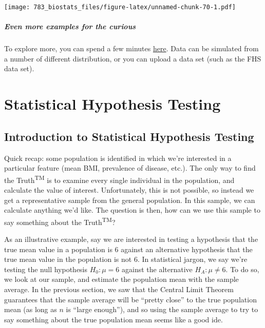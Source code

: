 \documentclass[]{book}
\theoremstyle{definition}
\theoremstyle{definition}
\theoremstyle{definition}
\theoremstyle{remark}
\begin{document}
\texttt{[image: 783\_biostats\_files/figure-latex/unnamed-chunk-70-1.pdf]}

\hypertarget{even-more-examples-for-the-curious}{%
\subsubsection*{Even more examples for the curious}\label{even-more-examples-for-the-curious}}

To explore more, you can spend a few minutes \href{https://rtrane.shinyapps.io/CLT_2/}{here}. Data can be simulated from a number of different distribution, or you can upload a data set (such as the FHS data set).

\hypertarget{part-statistical-hypothesis-testing}{%
\part{Statistical Hypothesis Testing}\label{part-statistical-hypothesis-testing}}

\hypertarget{introduction-to-statistical-hypothesis-testing}{%
\chapter{Introduction to Statistical Hypothesis Testing}\label{introduction-to-statistical-hypothesis-testing}}

Quick recap: some population is identified in which we're interested in a particular feature (mean BMI, prevalence of disease, etc.). The only way to find the Truth\textsuperscript{TM} is to examine every single individual in the population, and calculate the value of interest. Unfortunately, this is not possible, so instead we get a representative sample from the general population. In this sample, we can calculate anything we'd like. The question is then, how can we use this sample to say something about the Truth\textsuperscript{TM}?

As an illustrative example, say we are interested in testing a hypothesis that the true mean value in a population is 6 against an alternative hypothesis that the true mean value in the population is not 6. In statistical jargon, we say we're testing the null hypothesis \(H_0: \mu = 6\) against the alternative \(H_A: \mu \neq 6\). To do so, we look at our sample, and estimate the population mean with the sample average. In the previous section, we saw that the Central Limit Theorem guarantees that the sample average will be ``pretty close'' to the true population mean (as long as \(n\) is ``large enough''), and so using the sample average to try to say something about the true population mean seems like a good ide.
\end{document}
